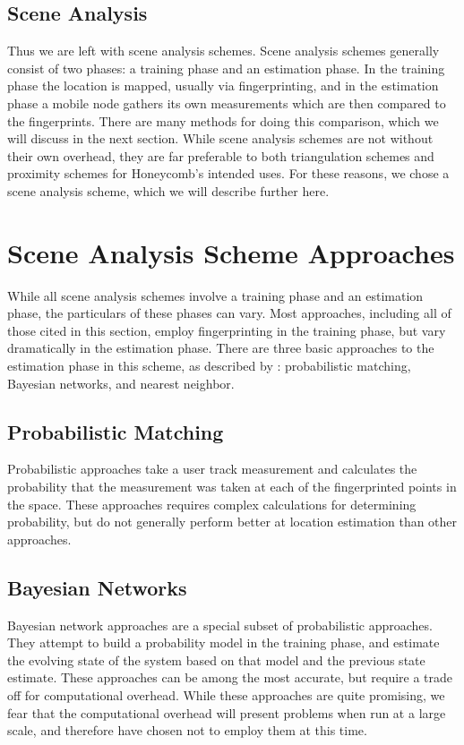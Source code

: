 \subsection{Scene Analysis} Thus we are left with scene analysis schemes. Scene analysis schemes generally consist of two phases: a training phase and an estimation phase. In the training phase the location is mapped, usually via fingerprinting, and in the estimation phase a mobile node gathers its own measurements which are then compared to the fingerprints. There are many methods for doing this comparison, which we will discuss in the next section. While scene analysis schemes are not without their own overhead, they are far preferable to both triangulation schemes and proximity schemes for Honeycomb's intended uses. For these reasons, we chose a scene analysis scheme, which we will describe further here.
	

\section{Scene Analysis Scheme Approaches}
%

While all scene analysis schemes involve a training phase and an estimation phase, the particulars of these phases can vary. Most approaches, including all of those cited in this section, employ fingerprinting in the training phase, but vary dramatically in the estimation phase. There are three basic approaches to the estimation phase in this scheme, as described by \cite{turner2011empirical}: probabilistic matching, Bayesian networks, and nearest neighbor. 

\subsection{Probabilistic Matching} Probabilistic approaches take a user track measurement and calculates the probability that the measurement was taken at each of the fingerprinted points in the space. These approaches requires complex calculations for determining probability, but do not generally perform better at location estimation than other approaches\cite{hotta2012robust}.

\subsection{Bayesian Networks} Bayesian network approaches \cite{ito2005bayesian} \cite{seshadri2005bayesian} are a special subset of probabilistic approaches. They attempt to build a probability model in the training phase, and estimate the evolving state of the system based on that model and the previous state estimate. These approaches can be among the most accurate, but require a trade off for computational overhead. While these approaches are quite promising, we fear that the computational overhead will present problems when run at a large scale, and therefore have chosen not to employ them at this time. 


